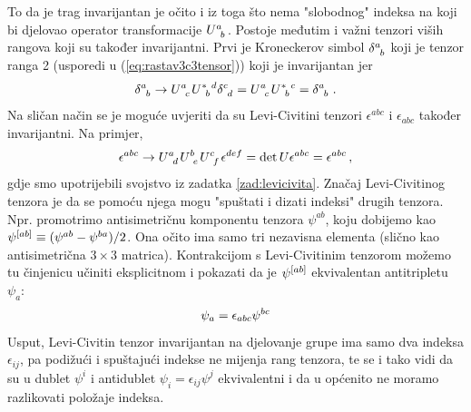 To da je trag invarijantan je očito i iz toga što nema
"slobodnog" indeksa na koji bi djelovao operator transformacije
$\tensor{U}{^{a}_{b}}$. Postoje međutim i važni tenzori
viših rangova koji su također invarijantni.
Prvi je Kroneckerov simbol $\tensor{\delta}{^a_b}$ koji je  
tenzor ranga 2 (usporedi u (\ref{eq:rastav3c3tensor})) koji je invarijantan jer
\begin{equation*}
\tensor{\delta}{^a_b} \to  \tensor{U}{^a_c}
\tensor{U}{^*_b^d} \tensor{\delta}{^c_d} = 
\tensor{U}{^a_c} \tensor{U}{^*_b^c} = \tensor{\delta}{^a_b} \;.
\end{equation*}
Na sličan način se je moguće uvjeriti da su Levi-Civitini
tenzori $\epsilon^{abc}$  i $\epsilon_{abc}$ 
također invarijantni. 
Na primjer, 
\begin{equation}
    \epsilon^{abc} \to     
     \tensor{U}{^a_d}
     \tensor{U}{^b_e}
     \tensor{U}{^c_f}\epsilon^{def} 
     = \det U \epsilon^{abc} = \epsilon^{abc} \,,
\end{equation}
gdje smo upotrijebili svojstvo iz zadatka \ref{zad:levicivita}.
Značaj Levi-Civitinog tenzora je da se pomoću
njega mogu "spuštati i dizati indeksi" drugih tenzora.
Npr. promotrimo antisimetričnu komponentu tenzora $\psi^{ab}$,
koju dobijemo kao $\tensor{\psi}{^{[ab]}} \equiv (\psi^{ab}-\psi^{ba})/2$.
Ona očito ima samo tri nezavisna elementa (slično kao
antisimetrična $3\times 3$ matrica). Kontrakcijom s 
Levi-Civitinim tenzorom možemo tu činjenicu učiniti eksplicitnom
i pokazati da je $\tensor{\psi}{^{[ab]}}$ ekvivalentan
antitripletu $\psi_a$:
\begin{equation}
  \psi_a = \epsilon_{abc} \tensor{\psi}{^{bc}}
\label{eq:spustanjeindeksa}
\end{equation}
Usput, Levi-Civitin tenzor invarijantan na 
djelovanje  grupe ima samo
dva indeksa $\epsilon_{ij}$, pa podižući i spuštajući
indekse ne mijenja rang tenzora, te se i tako vidi
da su u  dublet $\psi^{i}$ i antidublet
$\psi_{i} = \epsilon_{ij}\psi^{j}$ ekvivalentni i da
u  općenito ne moramo razlikovati položaje indeksa.

